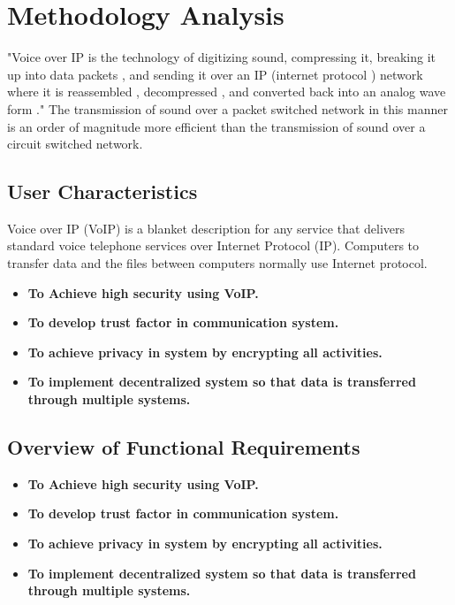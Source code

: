 \chapter{Methodology Analysis}
\justify
\quad 
"Voice over IP is the technology of digitizing sound, compressing it, breaking it up into data packets , and sending it over an IP (internet protocol ) network where it is reassembled , decompressed , and converted back into an analog wave form ." The transmission of sound over a packet switched network in this manner is an order of magnitude more efficient than the transmission of sound over a circuit switched network.

\section{User Characteristics}
\justify
\quad
Voice over IP (VoIP) is a blanket description for any service that delivers standard voice telephone services over Internet Protocol (IP). Computers to transfer data and the files between computers normally use Internet protocol.
\begin{itemize}
    \item \textbf{To Achieve high security using VoIP.}
    \item \textbf{To develop trust factor in communication system.}
    \item \textbf{To achieve privacy in system by encrypting all activities.}
    \item \textbf{To implement decentralized system so that data is transferred through multiple systems.}
\end{itemize}

\section{Overview of Functional Requirements}
\justify
\quad
\begin{itemize}
    \item \textbf{To Achieve high security using VoIP.}
    \item \textbf{To develop trust factor in communication system.}
    \item \textbf{To achieve privacy in system by encrypting all activities.}
    \item \textbf{To implement decentralized system so that data is transferred through multiple systems.}
\end{itemize}

\newpage